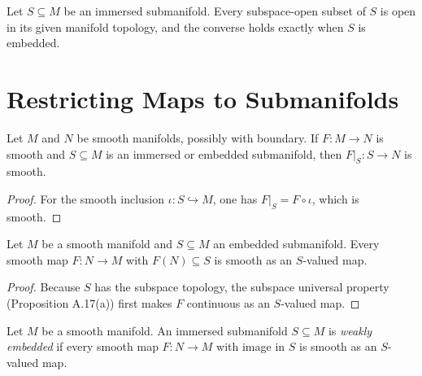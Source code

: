\begin{proposition}
\label{exer:5-20}




Let $S\subseteq M$ be an immersed submanifold. Every subspace-open subset of
$S$ is open in its given manifold topology, and the converse holds exactly
when $S$ is embedded.
\end{proposition}


\section{Restricting Maps to Submanifolds}

\begin{theorem}
\label{thm:5-27}



Let $M$ and $N$ be smooth manifolds, possibly with boundary. If $F:M\to N$ is
smooth and $S\subseteq M$ is an immersed or embedded submanifold, then
$F|_S:S\to N$ is smooth.
\end{theorem}

\begin{proof}
For the smooth inclusion $\iota:S\hookrightarrow M$, one has
$F|_S=F\circ\iota$, which is smooth.
\end{proof}

\begin{corollary}
\label{cor:5-30}




Let $M$ be a smooth manifold and $S\subseteq M$ an embedded submanifold. Every
smooth map $F:N\to M$ with $F(N)\subseteq S$ is smooth as an $S$-valued map.
\end{corollary}

\begin{proof}

\sketch Because $S$ has the subspace topology, the subspace universal property
(Proposition A.17(a)) first makes $F$ continuous as an $S$-valued map.
\end{proof}

\begin{definition}
\label{def:5-32-extra-2}




Let $M$ be a smooth manifold. An immersed submanifold $S\subseteq M$ is
\emph{weakly embedded} if every smooth map $F:N\to M$ with image in $S$ is
smooth as an $S$-valued map.
\end{definition}


